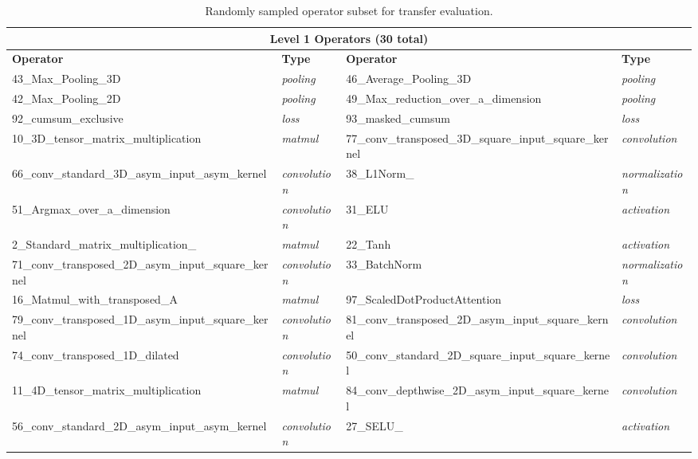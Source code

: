\documentclass{article} %
\theoremstyle{definition}
\theoremstyle{remark}
\begin{document}
  \begin{table}[h!]
  \centering
  \caption{Randomly sampled operator subset for transfer evaluation.}
  \label{tab:transfer_ops}
  \scriptsize
  \setlength{\tabcolsep}{4pt}
  \renewcommand{\arraystretch}{1.3}
  \begin{tabular}{@{}ll@{\hspace{1.2em}}ll@{}}
  \toprule
  \multicolumn{4}{c}{\textbf{Level 1 Operators (30 total)}} \\
  \midrule
  \textbf{Operator} & \textbf{Type} & \textbf{Operator} & \textbf{Type} \\
  \midrule
  43\_Max\_Pooling\_3D & \textit{pooling} & 46\_Average\_Pooling\_3D & \textit{pooling} \\
  42\_Max\_Pooling\_2D & \textit{pooling} & 49\_Max\_reduction\_over\_a\_dimension & \textit{pooling} \\
  92\_cumsum\_exclusive & \textit{loss} & 93\_masked\_cumsum & \textit{loss} \\
  10\_3D\_tensor\_matrix\_multiplication & \textit{matmul} & 77\_conv\_transposed\_3D\_square\_input\_square\_kernel & \textit{convolution} \\
  66\_conv\_standard\_3D\_asym\_input\_asym\_kernel & \textit{convolution} & 38\_L1Norm\_ & \textit{normalization} \\
  51\_Argmax\_over\_a\_dimension & \textit{convolution} & 31\_ELU & \textit{activation} \\
  2\_Standard\_matrix\_multiplication\_ & \textit{matmul} & 22\_Tanh & \textit{activation} \\
  71\_conv\_transposed\_2D\_asym\_input\_square\_kernel & \textit{convolution} & 33\_BatchNorm & \textit{normalization} \\
  16\_Matmul\_with\_transposed\_A & \textit{matmul} & 97\_ScaledDotProductAttention & \textit{loss} \\
  79\_conv\_transposed\_1D\_asym\_input\_square\_kernel & \textit{convolution} & 81\_conv\_transposed\_2D\_asym\_input\_square\_kernel & \textit{convolution} \\
  74\_conv\_transposed\_1D\_dilated & \textit{convolution} & 50\_conv\_standard\_2D\_square\_input\_square\_kernel & \textit{convolution} \\
  11\_4D\_tensor\_matrix\_multiplication & \textit{matmul} & 84\_conv\_depthwise\_2D\_asym\_input\_square\_kernel & \textit{convolution} \\
  56\_conv\_standard\_2D\_asym\_input\_asym\_kernel & \textit{convolution} & 27\_SELU\_ & \textit{activation} \\

\end{tabular}
\end{table}
\end{document}
